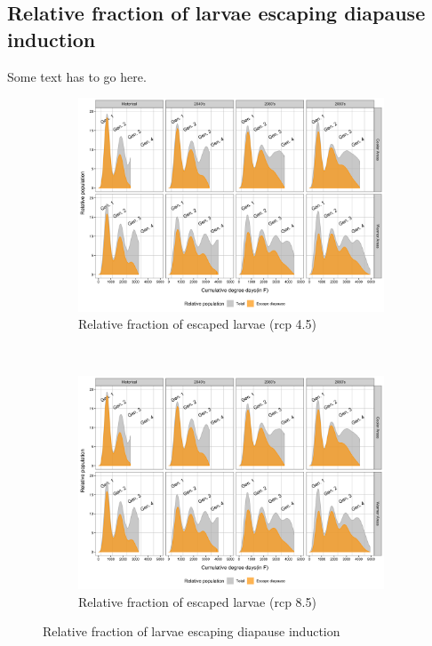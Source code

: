\documentclass[12pt]{article}
\theoremstyle{plain}
\theoremstyle{definition}
\theoremstyle{definition}
\begin{document}
\subsection{Relative fraction of larvae escaping diapause induction}
Some text has to go here.
\begin{figure}[h!]
    \centering
    \begin{subfigure}[b]{0.45\textwidth}
        \includegraphics[width=\textwidth]{figures/sensitivity/Diapause/diapause_rel_85_6.png}
        \caption{\scriptsize  Relative fraction of escaped larvae (rcp 4.5)}
        \label{fig:RFED_45)}
    \end{subfigure}
    ~ %
    \begin{subfigure}[b]{0.45\textwidth}
        \includegraphics[width=\textwidth]{figures/sensitivity/Diapause/diapause_rel_85_6.png}
        \caption{\scriptsize Relative fraction of escaped larvae (rcp 8.5)}
        \label{fig:RFED_85}
    \end{subfigure}
    \caption{Relative fraction of larvae escaping diapause induction}\label{fig:RFLEDI}
\end{figure}
\end{document}
